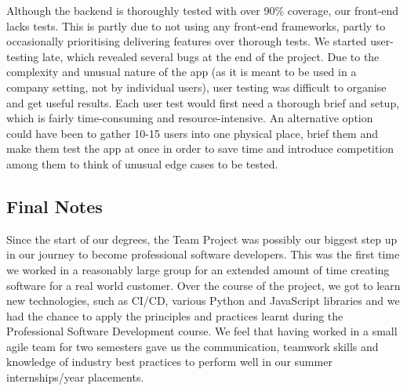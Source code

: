 \documentclass{l3proj}
\begin{document}
Although the backend is thoroughly tested with over 90\% coverage, our front-end lacks tests. This is partly due to not using any front-end frameworks, partly to occasionally prioritising delivering features over thorough tests.
We started user-testing late, which revealed several bugs at the end of the project. Due to the complexity and unusual nature of the app (as it is meant to be used in a company setting, not by individual users), user testing was difficult to organise and get useful results. Each user test would first need a thorough brief and setup, which is fairly time-consuming and resource-intensive. An alternative option could have been to gather 10-15 users into one physical place, brief them and make them test the app at once in order to save time and introduce competition among them to think of unusual edge cases to be tested.


\subsection{Final Notes}

Since the start of our degrees, the Team Project was possibly our biggest step up in our journey to become professional software developers. This was the first time we worked in a reasonably large group for an extended amount of time creating software for a real world customer. Over the course of the project, we got to learn new technologies, such as CI/CD, various Python and JavaScript libraries and we had the chance to apply the principles and practices learnt during the Professional Software Development course. We feel that having worked in a small agile team for two semesters gave us the communication, teamwork skills and knowledge of industry best practices to perform well in our summer internships/year placements.



\end{document}
